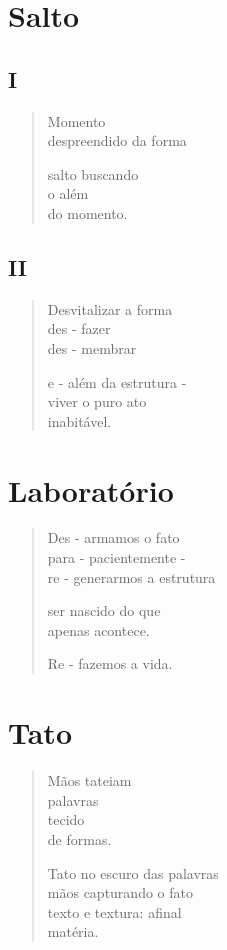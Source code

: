 \chapter{Salto}

\section{I}

\begin{verse}
Momento\\
despreendido da forma

salto buscando\\
o além\\
do momento.
\end{verse}

\section{II}

\begin{verse}
Desvitalizar a forma\\
des - fazer\\
des - membrar

e - além da estrutura -\\
viver o puro ato\\
inabitável.
\end{verse}

\chapter{Laboratório}

\begin{verse}
Des - armamos o fato\\
para - pacientemente -\\
re - generarmos a estrutura

ser nascido do que\\
apenas acontece.

Re - fazemos a vida.
\end{verse}

\chapter{Tato}

\begin{verse}
Mãos tateiam\\
palavras\\
tecido\\
de formas.

Tato no escuro das palavras\\
mãos capturando o fato\\
texto e textura: afinal\\
matéria.
\end{verse}

